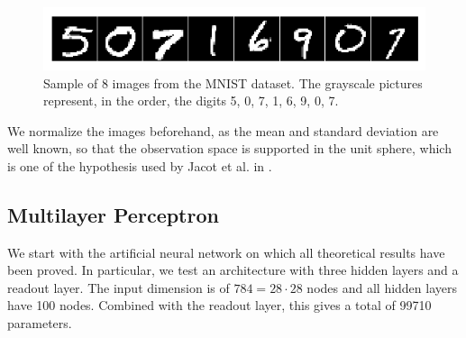 \documentclass[11pt,notitlepage]{article}
\numberwithin{equation}{section}
\theoremstyle{remark}
\theoremstyle{definition}
\begin{document}
	\begin{figure}[h!]
		\centering
		\includegraphics[width=.75\linewidth]{../Simulations/figures/mnist_sample.png}
		\caption{Sample of 8 images from the MNIST dataset.
		The grayscale pictures represent, in the order, the digits 5, 0, 7, 1, 6, 9, 0, 7.}
	\end{figure}
	
	We normalize the images beforehand, as the mean and standard deviation are well known, so that the observation space is supported in the unit sphere, which is one of the hypothesis used by Jacot et al. in \cite{jacot2018neural}.
	
	\subsection{Multilayer Perceptron}
	
	We start with the artificial neural network on which all theoretical results have been proved.
	In particular, we test an architecture with three hidden layers and a readout layer.
	The input dimension is of $784 = 28 \cdot 28$ nodes and all hidden layers have 100 nodes.
	Combined with the readout layer, this gives a total of 99710 parameters.
	
	
	
	
\end{document}
